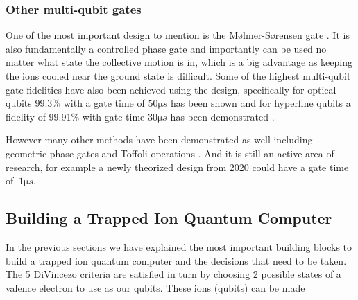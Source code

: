 \subsubsection{Other multi-qubit gates}
One of the most important design to mention is the Mølmer-Sørensen gate \cite{sorensenQuantumComputationIons1999}.
It is also fundamentally a controlled phase gate and importantly can be used no matter what state the collective motion is in, which is a big advantage as keeping the ions cooled near the ground state is difficult.
Some of the highest multi-qubit gate fidelities have also been achieved using the design, specifically for optical qubits 99.3\% with a gate time of $50\si{\micro s}$ has been shown \cite{benhelmFaulttolerantQuantumComputing2008} and for hyperfine qubits a fidelity of 99.91\% with gate time $30 \si{\micro s}$ has been demonstrated \cite{gaeblerHighFidelityUniversalGate2016}.

However many other methods have been demonstrated as well including geometric phase gates \cite{leibfriedExperimentalDemonstrationRobust2003, milburnIonTrapQuantum2000} and Toffoli operations \cite{monzRealizationQuantumToffoli2009}.
And it is still an active area of research, for example a newly theorized design from 2020 \cite{torronteguiUltrafastTwoqubitIon2020} could have a gate time of $~ 1 \si{\micro s}$.

\subsection{Building a Trapped Ion Quantum Computer}
In the previous sections we have explained the most important building blocks to build a trapped ion quantum computer and the decisions that need to be taken.
The 5 DiVincezo criteria are satisfied in turn by choosing 2 possible states of a valence electron to use as our qubits.
These ions (qubits) can be made 